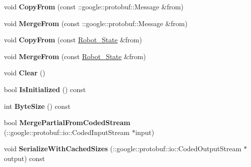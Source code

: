 \begin{DoxyCompactItemize}
\item 
void {\bfseries Copy\+From} (const \+::google\+::protobuf\+::\+Message \&from)\hypertarget{classvss__state_1_1Robot__State_ad8ff7bd295e28703ef3b6bdc6dba1435}{}\label{classvss__state_1_1Robot__State_ad8ff7bd295e28703ef3b6bdc6dba1435}

\item 
void {\bfseries Merge\+From} (const \+::google\+::protobuf\+::\+Message \&from)\hypertarget{classvss__state_1_1Robot__State_a5f5cb63411c8f37399dfd169c94e6e54}{}\label{classvss__state_1_1Robot__State_a5f5cb63411c8f37399dfd169c94e6e54}

\item 
void {\bfseries Copy\+From} (const \hyperlink{classvss__state_1_1Robot__State}{Robot\+\_\+\+State} \&from)\hypertarget{classvss__state_1_1Robot__State_a4e18e564b9c470d6f382c8c1c040cfb4}{}\label{classvss__state_1_1Robot__State_a4e18e564b9c470d6f382c8c1c040cfb4}

\item 
void {\bfseries Merge\+From} (const \hyperlink{classvss__state_1_1Robot__State}{Robot\+\_\+\+State} \&from)\hypertarget{classvss__state_1_1Robot__State_a66fadfccfb89ba8742bafa6cd9597420}{}\label{classvss__state_1_1Robot__State_a66fadfccfb89ba8742bafa6cd9597420}

\item 
void {\bfseries Clear} ()\hypertarget{classvss__state_1_1Robot__State_a78f3f24cbb0f2e1fac867550bf05da91}{}\label{classvss__state_1_1Robot__State_a78f3f24cbb0f2e1fac867550bf05da91}

\item 
bool {\bfseries Is\+Initialized} () const \hypertarget{classvss__state_1_1Robot__State_ae482d98ba51e51887efe37a4d2f6abb5}{}\label{classvss__state_1_1Robot__State_ae482d98ba51e51887efe37a4d2f6abb5}

\item 
int {\bfseries Byte\+Size} () const \hypertarget{classvss__state_1_1Robot__State_a6ff13cd34434ab985d2b560a13219532}{}\label{classvss__state_1_1Robot__State_a6ff13cd34434ab985d2b560a13219532}

\item 
bool {\bfseries Merge\+Partial\+From\+Coded\+Stream} (\+::google\+::protobuf\+::io\+::\+Coded\+Input\+Stream $\ast$input)\hypertarget{classvss__state_1_1Robot__State_a82a0f5270a13c5211d94c6da6726ab8d}{}\label{classvss__state_1_1Robot__State_a82a0f5270a13c5211d94c6da6726ab8d}

\item 
void {\bfseries Serialize\+With\+Cached\+Sizes} (\+::google\+::protobuf\+::io\+::\+Coded\+Output\+Stream $\ast$output) const \hypertarget{classvss__state_1_1Robot__State_a67b812e24a55cdfad4d58049f8e0e674}{}\label{classvss__state_1_1Robot__State_a67b812e24a55cdfad4d58049f8e0e674}


\end{DoxyCompactItemize}
